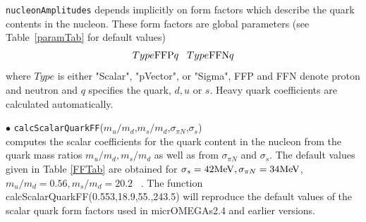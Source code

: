 \documentclass[12pt,a4paper]{article}
\begin{document}
\verb|nucleonAmplitudes| depends implicitly on form factors which describe the 
quark contents in the nucleon. These form factors are global parameters (see
Table~\ref{paramTab} for
default values)
\begin{equation}
Type{\rm FFP}q \;\;\; Type{\rm FFN}q \nonumber
\end{equation} 
where $Type$ is either "Scalar", "pVector", or "Sigma",  FFP and FFN denote proton and neutron  and
$q$ specifies the quark, $d,u$  or $s$. Heavy quark coefficients are calculated automatically.


\noindent$\bullet$
{\tt calcScalarQuarkFF}($m_u/m_d$,$m_s/m_d$,$\sigma_{\pi N}$,$\sigma_s$)\\
computes the scalar coefficients for the quark content in the nucleon from the quark mass ratios
$m_u/m_d, m_s/m_d$ as well as from $\sigma_{\pi N}$ and $\sigma_s$.
The default values given in Table  \ref{FFTab} are obtained for 
$\sigma_s=42{\rm MeV},\sigma_{\pi N}=34{\rm MeV}$, $m_u/m_d=0.56, m_s/m_d=20.2$ ~\cite{Beringer:1900zz}.
The function calcScalarQuarkFF(0.553,18.9,55.,243.5)  will reproduce   the default values of the  scalar quark
form factors used in micrOMEGAs2.4 and earlier  versions.

 
\end{document}

